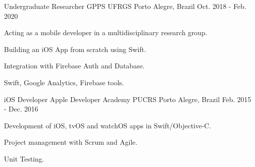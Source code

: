 \begin{cventries}
  \cventry
    {Undergraduate Researcher} %
    {GPPS UFRGS} %
    {Porto Alegre, Brazil} %
    {Oct. 2018 - Feb. 2020} %
    {
      \begin{cvitems} %
        \item {Acting as a mobile developer in a multidisciplinary research group.}
        \item {Building an iOS App from scratch using Swift.}
        \item {Integration with Firebase Auth and Database.}
        \item {Swift, Google Analytics, Firebase tools.}
        \end{cvitems}
    }

  \cventry
    {iOS Developer} %
    {Apple Developer Academy PUCRS} %
    {Porto Alegre, Brazil} %
    {Feb. 2015 - Dec. 2016} %
    {
      \begin{cvitems} %
      \item {Development of iOS, tvOS and watchOS apps in Swift/Objective-C.}
      \item {Project management with Scrum and Agile.}
      \item {Unit Testing.}
      \end{cvitems}
    }

\end{cventries}
